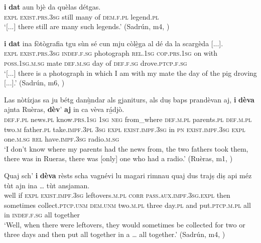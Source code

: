 \ea
\label{ex:exist.da1}
\gll  [...] \textbf{i} \textbf{dat} aun bjè da quèlas détgas.  \\
{} \textsc{expl} \textsc{exist.prs.3sg} still many of  \textsc{dem.f.pl} legend.\textsc{pl}\\
\glt `[...] there still are many such legends.' (Sadrún, m4, )
\z

\ea
\label{ex:exist.da2}
\gll    [...] \textbf{i} \textbf{dat} ina fòtògrafia tgu sùn sé cun mju còl{\`e̱}ga al dé da la scargèda [...].\\
{} \textsc{expl} \textsc{exist.prs.3sg}  \textsc{indef.f.sg} photograph \textsc{rel.1sg}  \textsc{cop.prs.1sg} on with \textsc{poss.1sg.m.sg} mate \textsc{def.m.sg} day of  \textsc{def.f.sg}  drove.\textsc{ptcp.f.sg}\\
\glt `[...] there is a photograph in which I am with my mate the day of the pig droving [...].' (Sadrún, m6, )
\z

\ea
\label{ex:exist.da3}
\gll    Las nòtízjas sa ju bétg danù̱ndar als gjaniturs, als duṣ baps prandèvan aj, \textbf{i} \textbf{dèva} ajnta Ruèras, \textbf{dèv}’ \textbf{aj} in ca vèva rá̱djò. \\
\textsc{def.f.pl} news.\textsc{pl} know.\textsc{prs.1sg} \textsc{1sg} \textsc{neg} from\_where \textsc{def.m.pl} parents.\textsc{pl} \textsc{def.m.pl} two.\textsc{m} father.\textsc{pl} take.\textsc{impf.3pl} \textsc{3sg} \textsc{expl} \textsc{exist.impf.3sg} in \textsc{pn} \textsc{exist.impf.3sg} \textsc{expl}  one.\textsc{m.sg} \textsc{rel} have.\textsc{impf.3sg} radio.\textsc{m.sg}\\
\glt `I don’t know where my parents had the news from, the two fathers took them, there was in Rueras, there was [only] one who had a radio.' (Ruèras, m1, )
\z

\ea
\label{ex:exist.da4}
\gll  Quaj sch’ \textbf{i} \textbf{dèva} rèsts scha vagnévi lu magari rimnau quaj dus trajṣ diṣ api méz tùt ajn ina … tùt ansjaman.  \\
well if \textsc{expl} \textsc{exist.impf.3sg} leftovers.\textsc{m.pl} \textsc{corr} \textsc{pass.aux.impf.3sg.expl} then sometimes collect.\textsc{ptcp.unm} \textsc{dem.unm} two.\textsc{m.pl} three day.\textsc{pl} and put.\textsc{ptcp.m.pl} all in  \textsc{indef.f.sg} {} all together\\
\glt `Well, when there were leftovers, they would sometimes be collected for two or three days and then put all together in a … all together.' (Sadrún, m4, )
\z

